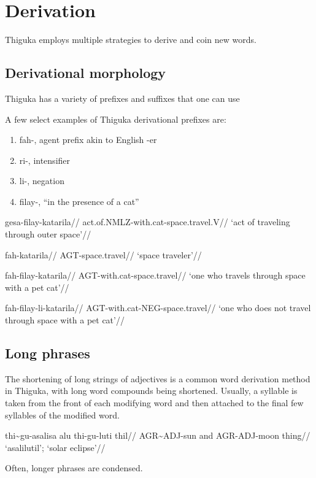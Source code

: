 \section{Derivation}
Thiguka employs multiple strategies to derive and coin new words.

\subsection{Derivational morphology}
Thiguka has a variety of prefixes and suffixes that one can use 

A few select examples of Thiguka derivational prefixes are:

\begin{enumerate}
    \item fah-, agent prefix akin to English -er
    \item ri-, intensifier
    \item li-, negation
    \item filay-, ``in the presence of a cat''
\end{enumerate}

\ex
\begingl
\gla  gesa-filay-katarila//
\glb  act.of.NMLZ-with.cat-space.travel.V//
\glft `act of traveling through outer space'//
\endgl
\xe

\ex
\begingl
\gla  fah-katarila//
\glb  AGT-space.travel//
\glft `space traveler'//
\endgl
\xe

\ex
\begingl
\gla  fah-filay-katarila//
\glb  AGT-with.cat-space.travel//
\glft `one who travels through space with a pet cat'//
\endgl
\xe

\ex
\begingl
\gla  fah-filay-li-katarila//
\glb  AGT-with.cat-NEG-space.travel//
\glft `one who does not travel through space with a pet cat'//
\endgl
\xe

\subsection{Long phrases}
The shortening of long strings of adjectives is a common word derivation method in Thiguka, with long word compounds being shortened.
Usually, a syllable is taken from the front of each modifying word and then attached to the final few syllables of the modified word.

\ex
\begingl
\gla   thi\~{}gu-asalisa alu thi-gu-luti thil//
\glb   AGR\~{}ADJ-sun and AGR-ADJ-moon thing//
\glft  `asalilutil'; `solar eclipse'//
\endgl
\xe

Often, longer phrases are condensed.

